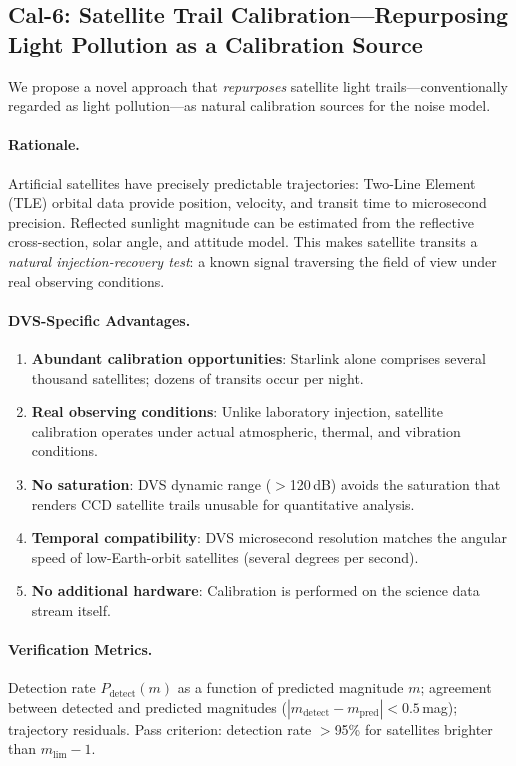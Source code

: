 \documentclass[12pt]{article}
\begin{document}
\subsection{Cal-6: Satellite Trail Calibration---Repurposing Light Pollution as a Calibration Source}

We propose a novel approach that \emph{repurposes} satellite light trails---conventionally regarded as light pollution---as natural calibration sources for the noise model.

\paragraph{Rationale.}
Artificial satellites have precisely predictable trajectories: Two-Line Element (TLE) orbital data provide position, velocity, and transit time to microsecond precision.
Reflected sunlight magnitude can be estimated from the reflective cross-section, solar angle, and attitude model.
This makes satellite transits a \emph{natural injection-recovery test}: a known signal traversing the field of view under real observing conditions.

\paragraph{DVS-Specific Advantages.}
\begin{enumerate}
  \item \textbf{Abundant calibration opportunities}: Starlink alone comprises several thousand satellites; dozens of transits occur per night.
  \item \textbf{Real observing conditions}: Unlike laboratory injection, satellite calibration operates under actual atmospheric, thermal, and vibration conditions.
  \item \textbf{No saturation}: DVS dynamic range ($>$120\,dB) avoids the saturation that renders CCD satellite trails unusable for quantitative analysis.
  \item \textbf{Temporal compatibility}: DVS microsecond resolution matches the angular speed of low-Earth-orbit satellites (several degrees per second).
  \item \textbf{No additional hardware}: Calibration is performed on the science data stream itself.
\end{enumerate}

\paragraph{Verification Metrics.}
Detection rate $P_\mathrm{detect}(m)$ as a function of predicted magnitude $m$; agreement between detected and predicted magnitudes ($|m_\mathrm{detect} - m_\mathrm{pred}| < 0.5$\,mag); trajectory residuals.
Pass criterion: detection rate $>$95\% for satellites brighter than $m_\mathrm{lim} - 1$.
\end{document}
